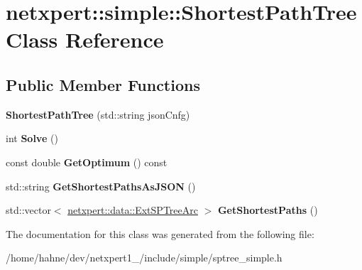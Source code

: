 \hypertarget{classnetxpert_1_1simple_1_1ShortestPathTree}{}\section{netxpert\+:\+:simple\+:\+:Shortest\+Path\+Tree Class Reference}
\label{classnetxpert_1_1simple_1_1ShortestPathTree}
\subsection*{Public Member Functions}
\begin{DoxyCompactItemize}
\item 
{\bfseries Shortest\+Path\+Tree} (std\+::string json\+Cnfg)\hypertarget{classnetxpert_1_1simple_1_1ShortestPathTree_a4ded1db3e88023be3da94f4817d1264d}{}\label{classnetxpert_1_1simple_1_1ShortestPathTree_a4ded1db3e88023be3da94f4817d1264d}

\item 
int {\bfseries Solve} ()\hypertarget{classnetxpert_1_1simple_1_1ShortestPathTree_a9c144586bb5ddc94c8618437c84027e3}{}\label{classnetxpert_1_1simple_1_1ShortestPathTree_a9c144586bb5ddc94c8618437c84027e3}

\item 
const double {\bfseries Get\+Optimum} () const \hypertarget{classnetxpert_1_1simple_1_1ShortestPathTree_ac0c22005112bf82fecb495d697e86df9}{}\label{classnetxpert_1_1simple_1_1ShortestPathTree_ac0c22005112bf82fecb495d697e86df9}

\item 
std\+::string {\bfseries Get\+Shortest\+Paths\+As\+J\+S\+ON} ()\hypertarget{classnetxpert_1_1simple_1_1ShortestPathTree_a06b7a717cb1efdb6901550a08d2ed7a5}{}\label{classnetxpert_1_1simple_1_1ShortestPathTree_a06b7a717cb1efdb6901550a08d2ed7a5}

\item 
std\+::vector$<$ \hyperlink{structnetxpert_1_1data_1_1ExtSPTreeArc}{netxpert\+::data\+::\+Ext\+S\+P\+Tree\+Arc} $>$ {\bfseries Get\+Shortest\+Paths} ()\hypertarget{classnetxpert_1_1simple_1_1ShortestPathTree_ae6891d22b808390a81aeafbc74fa1235}{}\label{classnetxpert_1_1simple_1_1ShortestPathTree_ae6891d22b808390a81aeafbc74fa1235}

\end{DoxyCompactItemize}


The documentation for this class was generated from the following file\+:\begin{DoxyCompactItemize}
\item 
/home/hahne/dev/netxpert1\+\_/include/simple/sptree\+\_\+simple.\+h\end{DoxyCompactItemize}
